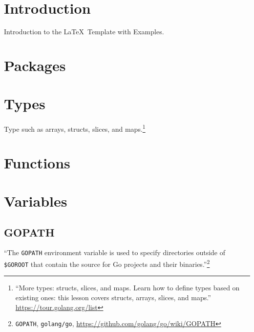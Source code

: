 \documentclass[12pt,letterpaper,dvips]{article}
\begin{document}
\newpage
\section{Introduction}
Introduction to the \LaTeX\ Template with Examples.



\newpage
\section{Packages}


\newpage
\section{Types}
Type such as arrays, structs, slices, and maps.\footnote{``More
types: structs, slices, and maps.  Learn how to define types
based on existing ones: this lesson covers structs, arrays, slices,
and maps.''\\
\href{https://tour.golang.org/list}{https://tour.golang.org/list}}


\newpage
\section{Functions}


\newpage
\section{Variables}

\subsection{GOPATH}
``The \texttt{GOPATH} environment variable is used to specify
directories outside of \texttt{\$GOROOT} that contain the source
for Go projects and their binaries.''\footnote{\texttt{GOPATH},
\texttt{golang/go}, \href{https://github.com/golang/go/wiki/GOPATH}{https://github.com/golang/go/wiki/GOPATH}}
\end{document}
